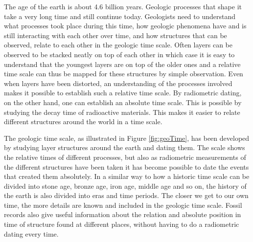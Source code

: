 \documentclass[a4paper,12pt]{report}
\begin{document}
The age of the earth is about 4.6 billion years. Geologic processes that shape it take a very long time and still continue today. Geologists need to understand what processes took place during this time, how geologic phenomena have and is still interacting with each other over time, and how structures that can be observed, relate to each other in the geologic time scale. Often layers can be observed to be stacked neatly on top of each other in which case it is easy to understand that the youngest layers are on top of the older ones and a relative time scale can thus be mapped for these structures by simple observation. Even when layers have been distorted, an understanding of the processes involved makes it possible to establish such a relative time scale. By radiometric dating, on the other hand, one can establish an absolute time scale. This is possible by studying the decay time of radioactive materials. This makes it easier to relate different structures around the world in a time scale.

The geologic time scale, as illustrated in Figure \ref{fig:geoTime}, has been developed by studying layer structures around the earth and dating them. The scale shows the relative times of different processes, but also as radiometric measurements of the different structures have been taken it has become possible to date the events that created them absolutely. In a similar way to how a historic time scale can be divided into stone age, bronze age, iron age, middle age and so on, the history of the earth is also divided into eras and time periods. The closer we get to our own time, the more details are known and included in the geologic time scale. Fossil records also give useful information about the relation and absolute position in time of structure found at different places, without having to do a radiometric dating every time.
\end{document}
